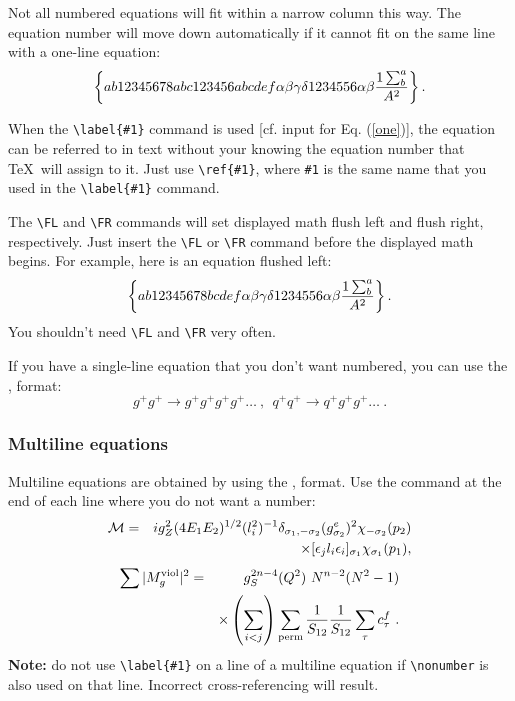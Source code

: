 Not all numbered equations will fit
within a narrow column this way. The equation number will move down
automatically if it cannot fit on the same line with a one-line equation:
\begin{equation}
\left\{ab12345678abc123456abcdef\alpha\beta\gamma\delta%
1234556\alpha\beta{1\sum^{a}_{b}\over A^2}\right\}.
\end{equation}

When the \verb+\label{#1}+ command is used [cf. input
for Eq. (\ref{one})],
the equation can be referred to in text without your knowing the
equation number that \TeX\ will assign to it. Just use
\verb+\ref{#1}+, where \verb+#1+ is the same name that you used in the
\verb+\label{#1}+ command.

The \verb+\FL+ and  \verb+\FR+ commands will set displayed math flush
left and flush right, respectively. Just insert the \verb+\FL+ or  \verb+\FR+
command before the displayed math begins. For example, here is an equation
flushed left:
\FL
\begin{equation}
\left\{ab12345678bcdef\alpha\beta\gamma\delta%
1234556\alpha\beta{1\sum^{a}_{b}\over A^2}\right\}.
\end{equation}
You shouldn't need \verb+\FL+ and  \verb+\FR+  very often.

If you have a single-line equation that you don't want
numbered, you can use the \btt{[}, \btt{]} format:
\[g^+g^+ \rightarrow g^+g^+g^+g^+ \dots ~,~~q^+q^+\rightarrow
q^+g^+g^+ \dots ~. \]

\subsubsection{Multiline equations}

Multiline equations are obtained by using the
,  format.
Use the 
command at the end of each line where you do not want a number:
\begin{eqnarray}
{\cal M}=&&ig_Z^2(4E_1E_2)^{1/2}(l_i^2)^{-1}
\delta_{\sigma_1,-\sigma_2}
(g_{\sigma_2}^e)^2\chi_{-\sigma_2}(p_2)\nonumber\\
&&\times
[\epsilon_jl_i\epsilon_i]_{\sigma_1}\chi_{\sigma_1}(p_1),
\end{eqnarray}
\begin{eqnarray}
\sum \vert M^{\rm viol}_g \vert ^2&=&g^{2n-4}_S(Q^2)~N^{n-2}
        (N^2-1)\nonumber \\
 & &\times \left( \sum_{i<j}\right)
  \sum_{\rm perm}
 {1 \over S_{12}}
 {1 \over S_{12}}\sum_\tau c^f_\tau~.
\end{eqnarray}
{\bf Note:} do not use \verb+\label{#1}+ on a line of a multiline
equation if \verb+\nonumber+ is also used on that line. Incorrect
cross-referencing will result.

